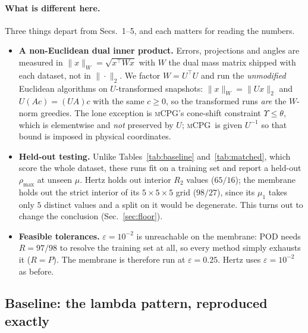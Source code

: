 \documentclass[11pt]{article}
\newcommand{\mCPG}{\textsc{mCPG}}
\begin{document}
\paragraph{What is different here.}
Three things depart from Secs.~1--5, and each matters for reading the numbers.
\begin{itemize}
  \item \textbf{A non-Euclidean dual inner product.} Errors, projections and
        angles are measured in $\|x\|_W=\sqrt{x^\top W x}$ with $W$ the dual mass
        matrix shipped with each dataset, not in $\|\cdot\|_2$. We factor
        $W=U^\top U$ and run the \emph{unmodified} Euclidean algorithms on
        $U$-transformed snapshots: $\|x\|_W=\|Ux\|_2$ and $U(Ac)=(UA)c$ with the
        same $c\ge0$, so the transformed runs \emph{are} the $W$-norm greedies.
        The lone exception is \mCPG's cone-shift constraint
        $\Upsilon\le\theta$, which is elementwise and \emph{not} preserved by
        $U$; \mCPG\ is given $U^{-1}$ so that bound is imposed in physical
        coordinates.
  \item \textbf{Held-out testing.} Unlike Tables~\ref{tab:baseline}
        and~\ref{tab:matched}, which score the whole dataset, these runs fit on a
        training set and report a held-out $\rho_{\max}$ at unseen $\mu$. Hertz
        holds out interior $R_2$ values ($65/16$); the membrane holds out the
        strict interior of its $5\times5\times5$ grid ($98/27$), since its
        $\mu_1$ takes only $5$ distinct values and a split on it would be
        degenerate. This turns out to change the conclusion (Sec.~\ref{sec:floor}).
  \item \textbf{Feasible tolerances.} $\varepsilon=10^{-2}$ is unreachable on the
        membrane: POD needs $R=97/98$ to resolve the training set at all, so
        every method simply exhausts it ($R=P$). The membrane is therefore run at
        $\varepsilon=0.25$. Hertz uses $\varepsilon=10^{-2}$ as before.
\end{itemize}

\subsection{Baseline: the lambda pattern, reproduced exactly}
\end{document}
